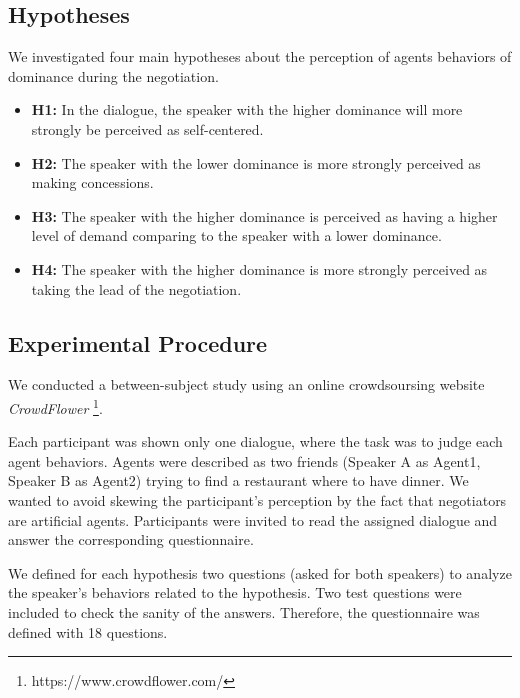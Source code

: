\documentclass{llncs}
\begin{document}
	\subsection{Hypotheses}
	We investigated four main hypotheses about the perception of agents behaviors of dominance during the negotiation. 
	\begin{itemize}
	\item  \textbf{H1:} In the dialogue, the speaker with the higher dominance will more strongly be perceived as self-centered.  
	
	\item \textbf{H2:} The speaker with the lower dominance is more strongly perceived as making concessions.
	
	\item \textbf{H3:} The speaker with the higher dominance is perceived as having a higher level of demand comparing to the speaker with a lower dominance.
	
	\item \textbf{H4:} The speaker with the higher dominance is more strongly perceived as taking the lead of the negotiation.
	
	\end{itemize}
	
	\subsection{Experimental Procedure}
	
	We conducted a between-subject study using an online crowdsoursing website \emph{CrowdFlower} \footnote{https://www.crowdflower.com/}. 
	
	
	Each participant was shown only one dialogue, where the task was to judge each agent behaviors. Agents were described as two friends (Speaker A as Agent1, Speaker B as Agent2) trying to find a restaurant where to have dinner. We wanted to avoid skewing the participant's perception by the fact that negotiators are artificial agents. Participants were invited to read the assigned dialogue and answer the corresponding questionnaire. 
	
	We defined for each hypothesis two questions (asked for both speakers) to analyze the speaker's behaviors related to the hypothesis. 
	Two test questions were included to check the sanity of the answers. Therefore, the questionnaire was defined with 18 questions.
	
\end{document}
